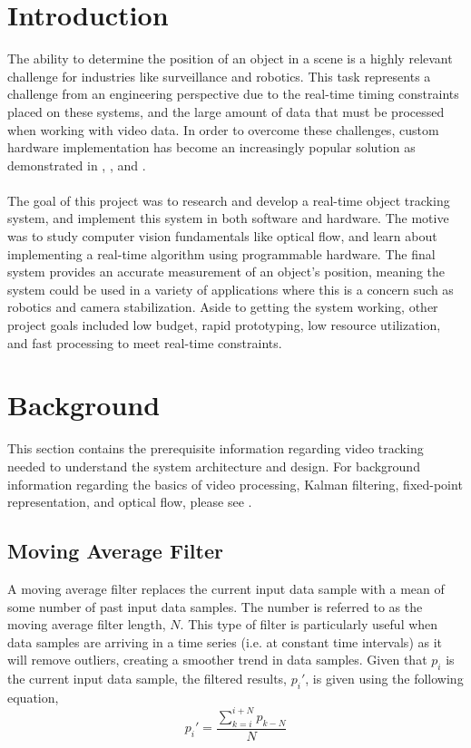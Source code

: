 \documentclass[11pt]{article} %
\begin{document}
\section{Introduction}
The ability to determine the position of an object in a scene is a highly relevant challenge for industries like surveillance and robotics. This task represents a challenge from an engineering perspective due to the real-time timing constraints placed on these systems, and the large amount of data that must be processed when working with video data. In order to overcome these challenges, custom hardware implementation has become an increasingly popular solution as demonstrated in \cite{1}, \cite{2}, and \cite{3}. \\\\
The goal of this project was to research and develop a real-time object tracking system, and implement this system in both software and hardware. The motive was to study computer vision fundamentals like optical flow, and learn about implementing a real-time algorithm using programmable hardware. The final system provides an accurate measurement of an object's position, meaning the system could be used in a variety of applications where this is a concern such as robotics and camera stabilization. Aside to getting the system working, other project goals included low budget, rapid prototyping, low resource utilization, and fast processing to meet real-time constraints.
\section{Background}
This section contains the prerequisite information regarding video tracking needed to understand the system architecture and design. For background information regarding the basics of video processing, Kalman filtering, fixed-point representation, and optical flow, please see \cite{phase1}.
\subsection{Moving Average Filter}
\label{sec:filter}
A moving average filter replaces the current input data sample with a mean of some number of past input data samples. The number is referred to as the moving average filter length, $N$. This type of filter is particularly useful when data samples are arriving in a time series (i.e. at constant time intervals) as it will remove outliers, creating a smoother trend in data samples. Given that $p_i$ is the current input data sample, the filtered results, $p_i'$, is given using the following equation,
\begin{equation}
p_i' = \frac{\sum_{k = i}^{i + N} p_{k-N}}{N}
\end{equation}
\end{document}
